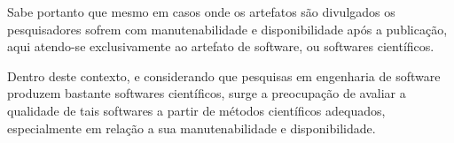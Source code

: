 \documentclass[qual, classic, a4paper]{ufbathesis}
\begin{document}

Sabe portanto que mesmo em casos onde os artefatos são divulgados os
pesquisadores sofrem com manutenabilidade e disponibilidade após a
publicação\cite{Prlic2012}, aqui atendo-se exclusivamente ao artefato de
software, ou softwares científicos.

Dentro deste contexto, e considerando que pesquisas em engenharia de software
produzem bastante softwares científicos, surge a preocupação de avaliar a
qualidade de tais softwares a partir de métodos científicos adequados,
especialmente em relação a sua manutenabilidade e disponibilidade.

%
%
%
\end{document}
